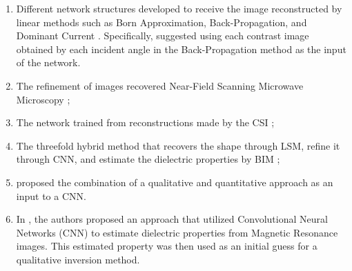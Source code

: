 		\begin{enumerate}
			\item Different network structures developed to receive the image reconstructed by linear methods such as Born Approximation, Back-Propagation, and Dominant Current \citep{sun2018efficient,wei2019deep,li2019performance,xiao2020fast,guo2021complex,zong2022wavelet}. Specifically, \cite{wei2022exploring} suggested using each contrast image obtained by each incident angle in the Back-Propagation method as the input of the network.
			\item The refinement of images recovered Near-Field Scanning Microwave Microscopy \citep{zhou2023physics};
			\item The network trained from reconstructions made by the CSI \citep{khoshdel2019enhancement};
			\item The threefold hybrid method that recovers the shape through LSM, refine it through CNN, and estimate the dielectric properties by BIM \citep{chen2021quantitative};
			\item \citep{zhang2020learning} proposed the combination of a qualitative and quantitative approach as an input to a CNN.
			\item In \citep{chen2020learning}, the authors proposed an approach that utilized Convolutional Neural Networks (CNN) to estimate dielectric properties from Magnetic Resonance images. This estimated property was then used as an initial guess for a qualitative inversion method.
		\end{enumerate}
		
